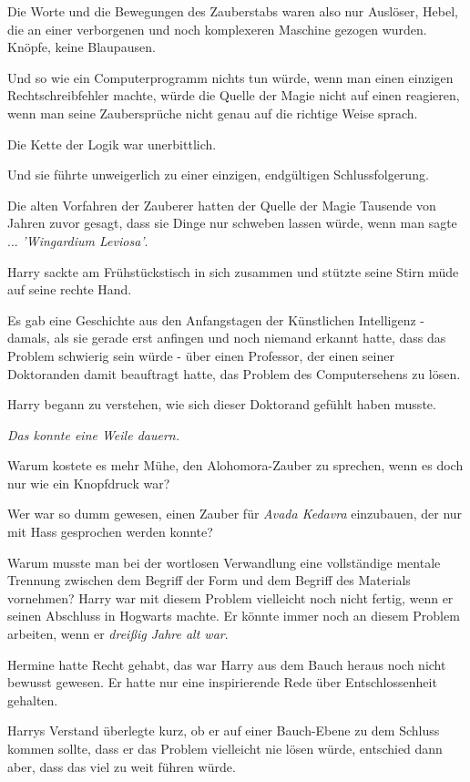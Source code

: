 Die Worte und die Bewegungen des Zauberstabs waren also nur Auslöser, Hebel, die
an einer verborgenen und noch komplexeren Maschine gezogen wurden. Knöpfe, keine
Blaupausen.

Und so wie ein Computerprogramm nichts tun würde, wenn man einen einzigen
Rechtschreibfehler machte, würde die Quelle der Magie nicht auf einen reagieren,
wenn man seine Zaubersprüche nicht genau auf die richtige Weise sprach.

Die Kette der Logik war unerbittlich.

Und sie führte unweigerlich zu einer einzigen, endgültigen Schlussfolgerung.

Die alten Vorfahren der Zauberer hatten der Quelle der Magie Tausende von Jahren
zuvor gesagt, dass sie Dinge nur schweben lassen würde, wenn man sagte ...
\emph{'Wingardium Leviosa'}.

Harry sackte am Frühstückstisch in sich zusammen und stützte seine Stirn müde
auf seine rechte Hand.

Es gab eine Geschichte aus den Anfangstagen der Künstlichen Intelligenz -
damals, als sie gerade erst anfingen und noch niemand erkannt hatte, dass das
Problem schwierig sein würde - über einen Professor, der einen seiner
Doktoranden damit beauftragt hatte, das Problem des Computersehens zu lösen.

Harry begann zu verstehen, wie sich dieser Doktorand gefühlt haben musste.

\emph{Das konnte eine Weile dauern.}

Warum kostete es mehr Mühe, den Alohomora-Zauber zu sprechen, wenn es doch nur
wie ein Knopfdruck war?

Wer war so dumm gewesen, einen Zauber für \emph{Avada Kedavra} einzubauen, der
nur mit Hass gesprochen werden konnte?

Warum musste man bei der wortlosen Verwandlung eine vollständige mentale
Trennung zwischen dem Begriff der Form und dem Begriff des Materials vornehmen?
Harry war mit diesem Problem vielleicht noch nicht fertig, wenn er seinen
Abschluss in Hogwarts machte. Er könnte immer noch an diesem Problem arbeiten,
wenn er \emph{dreißig Jahre alt war}.

Hermine hatte Recht gehabt, das war Harry aus dem Bauch heraus noch nicht
bewusst gewesen. Er hatte nur eine inspirierende Rede über Entschlossenheit
gehalten.

Harrys Verstand überlegte kurz, ob er auf einer Bauch-Ebene zu dem Schluss
kommen sollte, dass er das Problem vielleicht nie lösen würde, entschied dann
aber, dass das viel zu weit führen würde.

